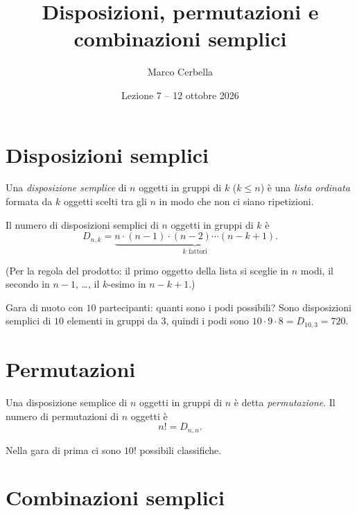 \documentclass[11pt,a4paper]{article}
\title{Disposizioni, permutazioni e combinazioni semplici}
\author{Marco Cerbella}
\date{Lezione 7 -- 12 ottobre 2026}
\begin{document}
\maketitle

\section{Disposizioni semplici}

\begin{definizione}
Una \emph{disposizione semplice} di $n$ oggetti in gruppi di $k$ ($k \leq n$) è una \emph{lista ordinata} formata da $k$ oggetti scelti tra gli $n$ in modo che non ci siano ripetizioni.
\end{definizione}

\begin{proposizione}
Il numero di disposizioni semplici di $n$ oggetti in gruppi di $k$ è
\[
D_{n,k} = \underbrace{n \cdot (n-1)\cdot(n-2) \cdots (n-k+1)}_{k \text{ fattori}} .
\]
\end{proposizione}

(Per la regola del prodotto: il primo oggetto della lista si sceglie in $n$ modi, il secondo in $n-1$, \dots, il $k$-esimo in $n-k+1$.)

\begin{esempio}
Gara di nuoto con $10$ partecipanti: quanti sono i podi possibili? Sono disposizioni semplici di $10$ elementi in gruppi da $3$, quindi i podi sono $10 \cdot 9 \cdot 8 = D_{10,3} = 720$.
\end{esempio}

\section{Permutazioni}

\begin{osservazione}
Una disposizione semplice di $n$ oggetti in gruppi di $n$ è detta \emph{permutazione}. Il numero di permutazioni di $n$ oggetti è
\[
n! = D_{n,n}.
\]
\end{osservazione}

\begin{esempio}
Nella gara di prima ci sono $10!$ possibili classifiche.
\end{esempio}

\section{Combinazioni semplici}
\end{document}
